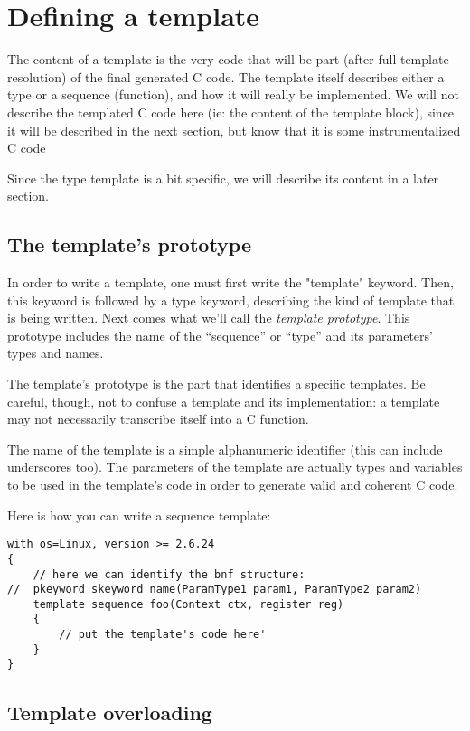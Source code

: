 \documentclass[american]{rtxreport}
\begin{document}
\chapter{Defining a template}

The content of a template is the very code that will be part (after full
template resolution) of the final generated C code. The template itself
describes either a type or a sequence (\rtx function), and how it
will really be implemented. We will not describe the templated C code here
(ie: the content of the template block), since it will be described in the next
section, but know that it is some instrumentalized C code

Since the type template is a bit specific, we will describe its content in a
later section.

\section{The template's prototype}

In order to write a template, one must first write the "template" keyword.
Then, this keyword is followed by a type keyword, describing the kind of
template that is being written. Next comes what we'll call the \emph{template
prototype}. This prototype includes the name of the “sequence” or “type” and its
parameters' types and names.

The template's prototype is the part that identifies a specific templates.
Be careful, though, not to confuse a template and its implementation: a
template may not necessarily transcribe itself into a C function.

The name of the template is a simple alphanumeric identifier (this can include
underscores too). The parameters of the template are actually \rtx types and
variables to be used in the template's code in order to generate valid and
coherent C code.

Here is how you can write a sequence template:
\begin{lstlisting}
with os=Linux, version >= 2.6.24
{
    // here we can identify the bnf structure: 
//  pkeyword skeyword name(ParamType1 param1, ParamType2 param2)
    template sequence foo(Context ctx, register reg)
    {
        // put the template's code here'
    }
}
\end{lstlisting}

\section{Template overloading}
\end{document}
